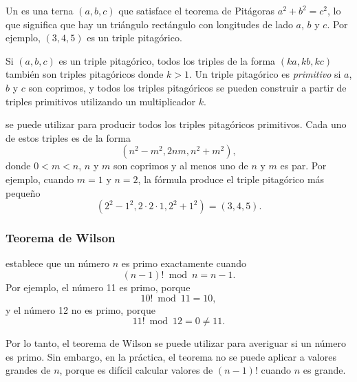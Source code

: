 Un  es una terna $(a,b,c)$
que satisface el teorema de Pitágoras
$a^2+b^2=c^2$, lo que significa que hay un triángulo rectángulo
con longitudes de lado $a$, $b$ y $c$.
Por ejemplo, $(3,4,5)$ es un triple pitagórico.

Si $(a,b,c)$ es un triple pitagórico,
todos los triples de la forma $(ka,kb,kc)$
también son triples pitagóricos donde $k>1$.
Un triple pitagórico es \emph{primitivo} si
$a$, $b$ y $c$ son coprimos,
y todos los triples pitagóricos se pueden construir
a partir de triples primitivos utilizando un multiplicador $k$.

 se puede utilizar para producir
todos los triples pitagóricos primitivos.
Cada uno de estos triples es de la forma
\[(n^2-m^2,2nm,n^2+m^2),\]
donde $0<m<n$, $n$ y $m$ son coprimos
y al menos uno de $n$ y $m$ es par.
Por ejemplo, cuando $m=1$ y $n=2$, la fórmula
produce el triple pitagórico más pequeño
\[(2^2-1^2,2\cdot2\cdot1,2^2+1^2)=(3,4,5).\]

\subsubsection{Teorema de Wilson}


establece que un número $n$
es primo exactamente cuando
\[(n-1)! \bmod n = n-1.\]
Por ejemplo, el número 11 es primo, porque
\[10! \bmod 11 = 10,\]
y el número 12 no es primo, porque
\[11! \bmod 12 = 0 \neq 11.\]

Por lo tanto, el teorema de Wilson se puede utilizar para averiguar
si un número es primo. Sin embargo, en la práctica, el teorema no se puede
aplicar a valores grandes de $n$, porque es difícil
calcular valores de $(n-1)!$ cuando $n$ es grande.
